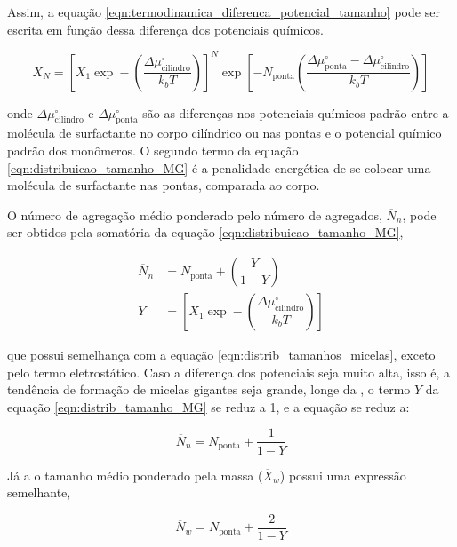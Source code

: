 		Assim, a equação \ref{eqn:termodinamica_diferenca_potencial_tamanho} pode ser escrita em função dessa diferença dos potenciais químicos.
		
		\begin{equation}
			X_N = \left[ X_1 \exp - \left( \dfrac{\Delta \mu_\mathrm{cilindro}^\circ}{k_b T} \right)  \right]^N \exp \left[ -N_\mathrm{ponta} \left( \dfrac{\Delta \mu_\mathrm{ponta}^\circ - \Delta \mu_\mathrm{cilindro}^\circ}{k_bT} \right)  \right]
			\label{eqn:distribuicao_tamanho_MG}
		\end{equation}
		
		\noindent onde \(\Delta \mu_\mathrm{cilindro}^\circ\) e \(\Delta \mu_\mathrm{ponta}^\circ\) são as diferenças nos potenciais químicos padrão entre a molécula de surfactante no corpo cilíndrico ou nas pontas e o potencial químico padrão dos monômeros. O segundo termo da equação \ref{eqn:distribuicao_tamanho_MG} é a penalidade energética de se colocar uma molécula de surfactante nas pontas, comparada ao corpo.
		
		O número de agregação médio ponderado pelo número de agregados, \(\overline{N}_n\), pode ser obtidos pela somatória da equação \ref{eqn:distribuicao_tamanho_MG},
		
		\begin{subequations}
			\begin{align}
			\overline{N}_n &= N_\mathrm{ponta} + \left( \dfrac{Y}{1 - Y} \right )  \\
			Y  &= \left[ X_1 \exp - \left( \dfrac{\Delta \mu_\mathrm{cilindro}^\circ}{k_b T} \right) \right]
			\end{align}
			\label{eqn:distrib_tamanho_MG}
		\end{subequations} 
				
		\noindent que possui semelhança com a equação \ref{eqn:distrib_tamanhos_micelas}, exceto pelo termo eletrostático. Caso a diferença dos potenciais seja muito alta, isso é, a tendência de formação de micelas gigantes seja grande, longe da \cmc, o termo \(Y\) da equação \ref{eqn:distrib_tamanho_MG} se reduz a 1, e a equação se reduz a:
		
		\begin{equation}
			\overline{N}_n = N_\mathrm{ponta} + \dfrac{1}{1 - Y}
			\label{eqn:distrib_tamanho_MG_reduzida}
		\end{equation}
		
		Já a o tamanho médio ponderado pela massa (\(\overline{X}_w\)) possui uma expressão semelhante,
		
		\begin{equation}
			\overline{N}_w = N_\mathrm{ponta} + \dfrac{2}{1 - Y}
			\label{eqn:distrib_tamanho_MG_reduzida_massa}
		\end{equation}
		
